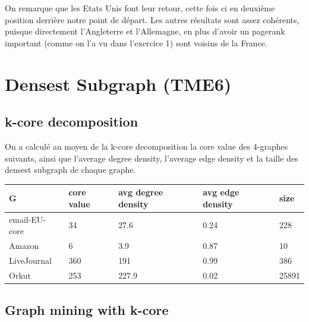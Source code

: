 \documentclass[a4paper]{report}
\begin{document}
On remarque que les Etats Unis font leur retour, cette fois ci en deuxième position derrière notre point de départ. Les autres résultats sont assez cohérents, puisque directement l'Angleterre et l'Allemagne, en plus d'avoir un pagerank important (comme on l'a vu dans l'exercice 1) sont voisins de la France.

\chapter{Densest Subgraph (TME6)}

\section{k-core decomposition}

On a calculé au moyen de la k-core decomposition la core value des 4-graphes suivants, ainsi que l'average degree density, l'average edge density et la taille des densest subgraph de chaque graphe.
\begin{center}
  \begin{tabular}{|l|l|l|l|l|}
    \hline
    G & core value & avg degree density & avg edge density & size\\
    \hline
    email-EU-core & 34 & 27.6 & 0.24 & 228\\
    Amazon & 6 & 3.9 & 0.87 & 10\\
    LiveJournal & 360 & 191 & 0.99 & 386\\
    Orkut & 253 & 227.9 & 0.02 & 25891 \\
    \hline
  \end{tabular}
\end{center}

\section{Graph mining with k-core}
\end{document}
